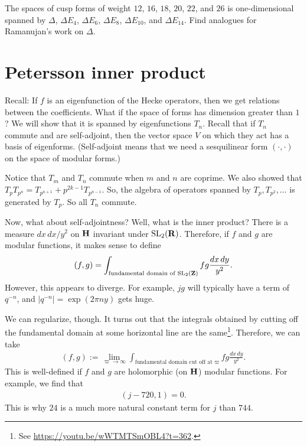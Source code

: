 \documentclass[11pt, oneside,margin=1in]{article}
\begin{document}
\begin{exercise}\label{}\text{}
The spaces of cusp forms of weight $12$, $16$, $18$, $20$, $22$, and $26$ is one-dimensional spanned by $\Delta$, $\Delta E_4$, $\Delta E_6$, $\Delta E_8$, $\Delta E_{10}$, and $\Delta E_{14}$. Find analogues for Ramanujan's work on $\Delta$.
\end{exercise}


\section{Petersson inner product}

Recall: If $f$ is an eigenfunction of the Hecke operators, then we get relations between the coefficients. What if the space of forms has dimension greater than $1$? We will show that it is spanned by eigenfunctions $T_n$. Recall that if $T_n$ commute and are self-adjoint, then the vector space $V$ on which they act has a basis of eigenforms. (Self-adjoint means that we need a sesquilinear form $(\cdot,\cdot)$ on the space of modular forms.)

Notice that $T_m$ and $T_n$ commute when $m$ and $n$ are coprime. We also showed that $T_pT_{p^n} = T_{p^{n+1}} + p^{2k-1}T_{p^{n-1}}$. So, the algebra of operators spanned by $T_p,T_{p^2},\hdots$ is generated by $T_p$. So all $T_n$ commute.

Now, what about self-adjointness? Well, what is the inner product? There is a measure $dx\,dx/y^2$ on $\mathbf H$ invariant under $\operatorname{SL}_{2}(\mathbf R)$. Therefore, if $f$ and $g$ are modular functions, it makes sense to define
\begin{align*}
	(f,g) =  \int_{\textrm{fundamental domain of $\operatorname{SL}_{2}(\mathbf Z)$}} fg\frac{dx\,dy}{y^2}. 
\end{align*}
However, this appears to diverge. For example, $jg$ will typically have a term of $q^{-n}$, and $\left\lvert q^{-n} \right\rvert = \exp(2\pi ny)$ gets huge.

We can regularize, though. It turns out that the integrals obtained by cutting off the fundamental domain at some horizontal line are the same\footnote{See \url{https://youtu.be/wWTMTSmOBL4?t=362}.}. Therefore, we can take
\begin{align*}
	(f,g) := \lim_{\varpi\to\infty}  \int_{\textrm{fundamental domain cut off at $\varpi$} }fg\frac{dx\,dy}{y^2}. 
\end{align*}
This is well-defined if $f$ and $g$ are holomorphic (on $\mathbf H$) modular functions. For example, we find that
\begin{align*}
	(j-720, 1) = 0.
\end{align*}
This is why $24$ is a much more natural constant term for $j$ than $744$.
\end{document}
